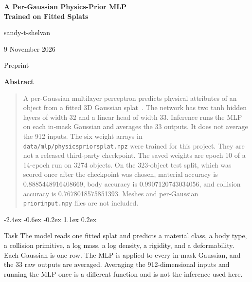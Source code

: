 \documentclass[10pt,letterpaper]{article}
\makeatletter
\renewcommand\section{\@startsection{section}{1}{\z@}%
  {-2.4ex \@plus -0.6ex \@minus -0.2ex}%
  {1.1ex \@plus 0.2ex}%
  {\large\bfseries\raggedright}}
\DeclareRobustCommand{\_}{\textunderscore\allowbreak}
\makeatother
\begin{document}
\begin{lrbox}{\titlebox}
\begin{minipage}{\textwidth}
\begin{center}
{\LARGE\bfseries A Per-Gaussian Physics-Prior MLP\\[0.15em]
Trained on Fitted Splats\par}
\vspace{0.7em}
{\large sandy-t-shelvan\par}
\vspace{0.35em}
{9 November 2026\par}
\vspace{0.25em}
{\footnotesize Preprint\par}
\end{center}
\vspace{0.15em}
\begin{center}
{\large\bfseries Abstract}
\end{center}
\begin{quote}
A per-Gaussian multilayer perceptron predicts physical attributes of an object from a fitted 3D Gaussian splat~\cite{kerbl2023gaussian}.
The network has two tanh hidden layers of width 32 and a linear head of width 33.
Inference runs the MLP on each in-mask Gaussian and averages the 33 outputs.
It does not average the 912 inputs.
The six weight arrays in \texttt{data/mlp/physics\_prior\_splat.npz} were trained for this project.
They are not a released third-party checkpoint.
The saved weights are epoch 10 of a 14-epoch run on 3274 objects.
On the 323-object test split, which was scored once after the checkpoint was chosen, material accuracy is 0.8885448916408669, body accuracy is 0.9907120743034056, and collision accuracy is 0.7678018575851393.
Meshes and per-Gaussian \texttt{prior\_input.npy} files are not included.
\end{quote}
\vspace{0.35em}
\end{minipage}
\end{lrbox}

\twocolumn[\usebox\titlebox]
\thispagestyle{plain}

\section{Task}
The model reads one fitted splat and predicts a material class, a body type, a collision primitive, a log mass, a log density, a rigidity, and a deformability.
Each Gaussian is one row.
The MLP is applied to every in-mask Gaussian, and the 33 raw outputs are averaged.
Averaging the 912-dimensional inputs and running the MLP once is a different function and is not the inference used here.
\end{document}
